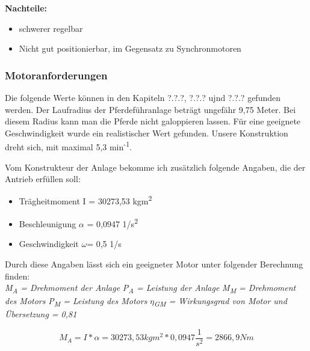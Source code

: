 \textbf{Nachteile:}

\begin{itemize}
	\item{schwerer regelbar}
	\item{Nicht gut positionierbar, im Gegensatz zu Synchronmotoren}
\end{itemize}

\subsubsection{Motoranforderungen}
\label{sec:motoranforderungen}

Die folgende Werte können in den Kapiteln ?.?.?, ?.?.? ujnd ?.?.? gefunden werden. 
Der Laufradius der Pferdeführanlage beträgt ungefähr 9,75 Meter. Bei diesem Radius kann man die Pferde nicht galoppieren lassen. 
Für eine geeignete Geschwindigkeit wurde ein realistischer Wert gefunden. %
Unsere Konstruktion dreht sich, mit maximal 5,3 min\textsuperscript{-1}. 

Vom Konstrukteur der Anlage bekomme ich zusätzlich folgende Angaben, die der Antrieb erfüllen soll:
\\

\begin{itemize}
	\item{Trägheitmoment I = 30273,53 kgm\textsuperscript{2}}
	\item{Beschleunigung $\alpha$ = 0,0947 1/s\textsuperscript{2}}
	\item{Geschwindigkeit $\omega$= 0,5 1/s}
\end{itemize}

Durch diese Angaben lässt sich ein geeigneter Motor unter folgender Berechnung finden:
\\
\textit{M\textsubscript{A} = Drehmoment der Anlage} \newline
\textit{P\textsubscript{A} = Leistung der Anlage} \newline
\textit{M\textsubscript{M} = Drehmoment des Motors} \newline
\textit{P\textsubscript{M} = Leistung des Motors} \newline
\textit{$\eta$\textsubscript{GM} = Wirkungsgrad von Motor und Übersetzung = 0,81}


\begin{center}
\begin{equation}
  \label{eq:2}
	M_{A} = I * \alpha = 30273,53kgm^2 * 0,0947 \dfrac{1}{s^2} = 2866,9 Nm
\end{equation} 
\end{center}


